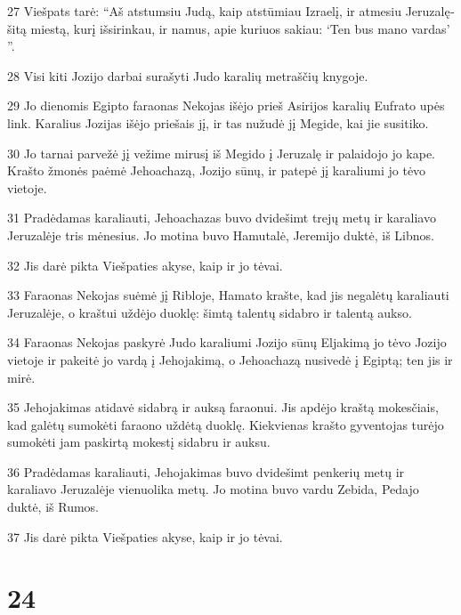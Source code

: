 \par 27 Viešpats tarė: “Aš atstumsiu Judą, kaip atstūmiau Izraelį, ir atmesiu Jeruzalę­šitą miestą, kurį išsirinkau, ir namus, apie kuriuos sakiau: ‘Ten bus mano vardas’ ”. 
\par 28 Visi kiti Jozijo darbai surašyti Judo karalių metraščių knygoje. 
\par 29 Jo dienomis Egipto faraonas Nekojas išėjo prieš Asirijos karalių Eufrato upės link. Karalius Jozijas išėjo priešais jį, ir tas nužudė jį Megide, kai jie susitiko. 
\par 30 Jo tarnai parvežė jį vežime mirusį iš Megido į Jeruzalę ir palaidojo jo kape. Krašto žmonės paėmė Jehoachazą, Jozijo sūnų, ir patepė jį karaliumi jo tėvo vietoje. 
\par 31 Pradėdamas karaliauti, Jehoachazas buvo dvidešimt trejų metų ir karaliavo Jeruzalėje tris mėnesius. Jo motina buvo Hamutalė, Jeremijo duktė, iš Libnos. 
\par 32 Jis darė pikta Viešpaties akyse, kaip ir jo tėvai. 
\par 33 Faraonas Nekojas suėmė jį Ribloje, Hamato krašte, kad jis negalėtų karaliauti Jeruzalėje, o kraštui uždėjo duoklę: šimtą talentų sidabro ir talentą aukso. 
\par 34 Faraonas Nekojas paskyrė Judo karaliumi Jozijo sūnų Eljakimą jo tėvo Jozijo vietoje ir pakeitė jo vardą į Jehojakimą, o Jehoachazą nusivedė į Egiptą; ten jis ir mirė. 
\par 35 Jehojakimas atidavė sidabrą ir auksą faraonui. Jis apdėjo kraštą mokesčiais, kad galėtų sumokėti faraono uždėtą duoklę. Kiekvienas krašto gyventojas turėjo sumokėti jam paskirtą mokestį sidabru ir auksu. 
\par 36 Pradėdamas karaliauti, Jehojakimas buvo dvidešimt penkerių metų ir karaliavo Jeruzalėje vienuolika metų. Jo motina buvo vardu Zebida, Pedajo duktė, iš Rumos. 
\par 37 Jis darė pikta Viešpaties akyse, kaip ir jo tėvai.



\chapter{24}

